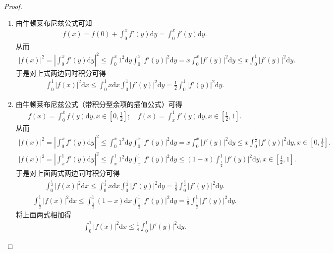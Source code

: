 \documentclass[../../main.tex]{subfiles}%
\begin{document}
\begin{proof}
\begin{enumerate}
\item 由牛顿莱布尼兹公式可知
\begin{align*}
f(x) = f(0) + \int_{0}^{x}f'(y)\mathrm{d}y=\int_{0}^{x}f'(y)\mathrm{d}y.
\end{align*}
从而
\begin{align*}
|f(x)|^2 = \left| \int_{0}^{x}f'(y)\mathrm{d}y \right|^2 \leqslant \int_{0}^{x}1^2\mathrm{d}y \int_{0}^{x}|f'(y)|^2\mathrm{d}y = x\int_{0}^{x}|f'(y)|^2\mathrm{d}y \leqslant x\int_{0}^{1}|f'(y)|^2\mathrm{d}y.
\end{align*}
于是对上式两边同时积分可得
\begin{align*}
\int_{0}^{1}|f(x)|^2\mathrm{d}x \leqslant \int_{0}^{1}x\mathrm{d}x \int_{0}^{1}|f'(y)|^2\mathrm{d}y = \frac{1}{2}\int_{0}^{1}|f'(y)|^2\mathrm{d}y.
\end{align*}

\item 由牛顿莱布尼兹公式（带积分型余项的插值公式）可得
\begin{align*}
f(x) = \int_{0}^{x}f(y)\mathrm{d}y, x \in \left[0, \frac{1}{2}\right]; \quad f(x) = \int_{x}^{1}f'(y)\mathrm{d}y, x \in \left[\frac{1}{2}, 1\right].
\end{align*}
从而
\begin{align*}
|f(x)|^2 = \left| \int_{0}^{x}f'(y)\mathrm{d}y \right|^2 \leqslant \int_{0}^{x}1^2\mathrm{d}y\int_{0}^{x}|f'(y)|^2\mathrm{d}y = x\int_{0}^{x}|f'(y)|^2\mathrm{d}y \leqslant x\int_{0}^{\frac{1}{2}}|f'(y)|^2\mathrm{d}y, x \in \left[0, \frac{1}{2}\right].
\end{align*}
\begin{align*}
|f(x)|^2=\left| \int_x^1{f' (y)\mathrm{d}y} \right|^2\leqslant \int_x^1{1^2\mathrm{d}y\int_x^1{|f' (y)|^2\mathrm{d}y}}\leqslant (1-x)\int_{\frac{1}{2}}^1{|f' (y)|^2\mathrm{d}y,x}\in \left[ \frac{1}{2},1 \right] .
\end{align*}
于是对上面两式两边同时积分可得
\begin{align*}
\int_{0}^{\frac{1}{2}}|f(x)|^2\mathrm{d}x \leqslant \int_{0}^{\frac{1}{2}}x\mathrm{d}x\int_{0}^{\frac{1}{2}}|f'(y)|^2\mathrm{d}y = \frac{1}{8}\int_{0}^{\frac{1}{2}}|f'(y)|^2\mathrm{d}y.
\end{align*}
\begin{align*}
\int_{\frac{1}{2}}^{1}|f(x)|^2\mathrm{d}x \leqslant \int_{\frac{1}{2}}^{1}(1 - x)\mathrm{d}x\int_{\frac{1}{2}}^{1}|f'(y)|^2\mathrm{d}y = \frac{1}{8}\int_{\frac{1}{2}}^{1}|f'(y)|^2\mathrm{d}y.
\end{align*}
将上面两式相加得
\begin{align*}
\int_{0}^{1}|f(x)|^2\mathrm{d}x \leqslant \frac{1}{8}\int_{0}^{1}|f'(y)|^2\mathrm{d}y.
\end{align*}
\end{enumerate}

\end{proof}
\end{document}
